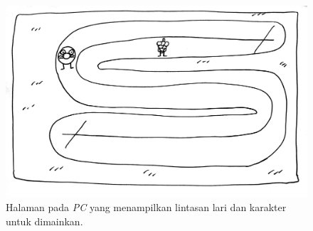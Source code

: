 \begin{enumerate}
\begin{figure}[H]
	\centering
	\includegraphics[scale=0.1]{Gambar/web5_gameplay2}
	\caption{Halaman pada \textit{PC} yang menampilkan lintasan lari dan karakter untuk dimainkan.}
	\label{fig:web5_gameplay2}
\end{figure}
%		
%		
%		
%	

\end{enumerate}
